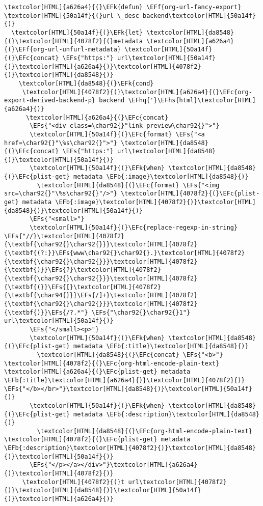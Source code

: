 \documentclass{scrartcl}
\newcommand{\EFk}[1]{\textcolor{EFk}{#1}} %
\newcommand{\EFs}[1]{\textcolor{EFs}{#1}} %
\newcommand{\EFb}[1]{\textcolor{EFb}{#1}} %
\newcommand{\EFc}[1]{\textcolor{EFc}{#1}} %
\newcommand{\EFf}[1]{\textcolor{EFf}{#1}} %
\newcommand{\EFhq}[1]{\textcolor{EFhq}{#1}} %
\newcommand{\EFhs}[1]{\textcolor{EFhs}{#1}} %
\begin{document}
\begin{Code}
\begin{Verbatim}[]
 \textcolor[HTML]{a626a4}{(}\EFk{defun} \EFf{org-url-fancy-export} \textcolor[HTML]{50a14f}{(}url \_desc backend\textcolor[HTML]{50a14f}{)}
  \textcolor[HTML]{50a14f}{(}\EFk{let} \textcolor[HTML]{da8548}{(}\textcolor[HTML]{4078f2}{(}metadata \textcolor[HTML]{a626a4}{(}\EFf{org-url-unfurl-metadata} \textcolor[HTML]{50a14f}{(}\EFc{concat} \EFs{"https:"} url\textcolor[HTML]{50a14f}{)}\textcolor[HTML]{a626a4}{)}\textcolor[HTML]{4078f2}{)}\textcolor[HTML]{da8548}{)}
    \textcolor[HTML]{da8548}{(}\EFk{cond}
     \textcolor[HTML]{4078f2}{(}\textcolor[HTML]{a626a4}{(}\EFc{org-export-derived-backend-p} backend \EFhq{'}\EFhs{html}\textcolor[HTML]{a626a4}{)}
      \textcolor[HTML]{a626a4}{(}\EFc{concat}
       \EFs{"<div class=\char92{}"link-preview\char92{}">"}
       \textcolor[HTML]{50a14f}{(}\EFc{format} \EFs{"<a href=\char92{}"\%s\char92{}">"} \textcolor[HTML]{da8548}{(}\EFc{concat} \EFs{"https:"} url\textcolor[HTML]{da8548}{)}\textcolor[HTML]{50a14f}{)}
       \textcolor[HTML]{50a14f}{(}\EFk{when} \textcolor[HTML]{da8548}{(}\EFc{plist-get} metadata \EFb{:image}\textcolor[HTML]{da8548}{)}
         \textcolor[HTML]{da8548}{(}\EFc{format} \EFs{"<img src=\char92{}"\%s\char92{}"/>"} \textcolor[HTML]{4078f2}{(}\EFc{plist-get} metadata \EFb{:image}\textcolor[HTML]{4078f2}{)}\textcolor[HTML]{da8548}{)}\textcolor[HTML]{50a14f}{)}
       \EFs{"<small>"}
       \textcolor[HTML]{50a14f}{(}\EFc{replace-regexp-in-string} \EFs{"//}\textcolor[HTML]{4078f2}{\textbf{\char92{}\char92{}}}\textcolor[HTML]{4078f2}{\textbf{(?:}}\EFs{www\char92{}\char92{}.}\textcolor[HTML]{4078f2}{\textbf{\char92{}\char92{}}}\textcolor[HTML]{4078f2}{\textbf{)}}\EFs{?}\textcolor[HTML]{4078f2}{\textbf{\char92{}\char92{}}}\textcolor[HTML]{4078f2}{\textbf{(}}\EFs{[}\textcolor[HTML]{4078f2}{\textbf{\char94{}}}\EFs{/]+}\textcolor[HTML]{4078f2}{\textbf{\char92{}\char92{}}}\textcolor[HTML]{4078f2}{\textbf{)}}\EFs{/?.*"} \EFs{"\char92{}\char92{}1"} url\textcolor[HTML]{50a14f}{)}
       \EFs{"</small><p>"}
       \textcolor[HTML]{50a14f}{(}\EFk{when} \textcolor[HTML]{da8548}{(}\EFc{plist-get} metadata \EFb{:title}\textcolor[HTML]{da8548}{)}
         \textcolor[HTML]{da8548}{(}\EFc{concat} \EFs{"<b>"} \textcolor[HTML]{4078f2}{(}\EFc{org-html-encode-plain-text} \textcolor[HTML]{a626a4}{(}\EFc{plist-get} metadata \EFb{:title}\textcolor[HTML]{a626a4}{)}\textcolor[HTML]{4078f2}{)} \EFs{"</b></br>"}\textcolor[HTML]{da8548}{)}\textcolor[HTML]{50a14f}{)}
       \textcolor[HTML]{50a14f}{(}\EFk{when} \textcolor[HTML]{da8548}{(}\EFc{plist-get} metadata \EFb{:description}\textcolor[HTML]{da8548}{)}
         \textcolor[HTML]{da8548}{(}\EFc{org-html-encode-plain-text} \textcolor[HTML]{4078f2}{(}\EFc{plist-get} metadata \EFb{:description}\textcolor[HTML]{4078f2}{)}\textcolor[HTML]{da8548}{)}\textcolor[HTML]{50a14f}{)}
       \EFs{"</p></a></div>"}\textcolor[HTML]{a626a4}{)}\textcolor[HTML]{4078f2}{)}
     \textcolor[HTML]{4078f2}{(}t url\textcolor[HTML]{4078f2}{)}\textcolor[HTML]{da8548}{)}\textcolor[HTML]{50a14f}{)}\textcolor[HTML]{a626a4}{)}


\end{Verbatim}
\end{Code}
\end{document}
